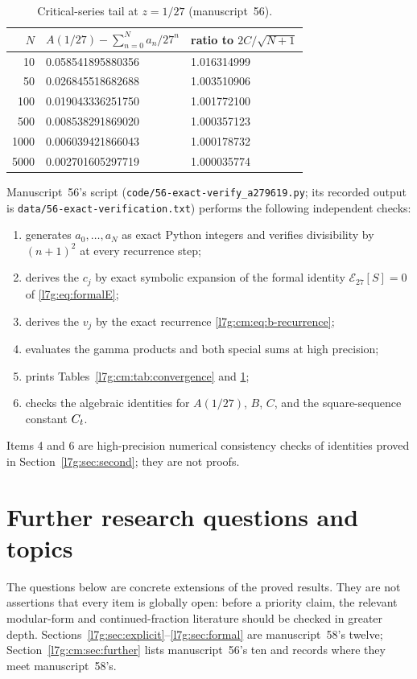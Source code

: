 \documentclass[11pt,letterpaper]{article}
\newcommand{\file}[1]{\nolinkurl{#1}}
\theoremstyle{remark}\newtheorem{remark}[theorem]{Remark}
\newcounter{l7gtrsavedeq}
\begin{document}
\begin{table}[htbp]
\centering\small
\caption{Critical-series tail at $z=1/27$ (manuscript~56).}
\label{l7g:cm:tab:tail}
\begin{tabular}{rll}
\toprule
$N$ & $A(1/27)-\sum_{n=0}^{N}a_n/27^n$
& ratio to $2C/\sqrt{N+1}$\\
\midrule
10   & 0.058541895880356 & 1.016314999\\
50   & 0.026845518682688 & 1.003510906\\
100  & 0.019043336251750 & 1.001772100\\
500  & 0.008538291869020 & 1.000357123\\
1000 & 0.006039421866043 & 1.000178732\\
5000 & 0.002701605297719 & 1.000035774\\
\bottomrule
\end{tabular}
\end{table}

Manuscript~56's script (\file{code/56-exact-verify_a279619.py}; its
recorded output is \file{data/56-exact-verification.txt}) performs the
following independent checks:
\begin{enumerate}[leftmargin=2em]
\item generates $a_0,\ldots,a_N$ as exact Python integers and verifies
      divisibility by $(n+1)^2$ at every recurrence step;
\item derives the $c_j$ by exact symbolic expansion of the formal identity
      $\mathcal E_{27}[S]=0$ of \eqref{l7g:eq:formalE};
\item derives the $v_j$ by the exact recurrence
      \eqref{l7g:cm:eq:b-recurrence};
\item evaluates the gamma products and both special sums at high
      precision;
\item prints Tables~\ref{l7g:cm:tab:convergence} and \ref{l7g:cm:tab:tail};
\item checks the algebraic identities for $A(1/27)$, $B$, $C$, and
      the square-sequence constant $C_{t}$.
\end{enumerate}
Items 4 and 6 are high-precision numerical consistency checks of
identities proved in Section~\ref{l7g:sec:second}; they are not proofs.

\section{Further research questions and topics}\label{l7g:sec:further}

The questions below are concrete extensions of the proved results.
They are not assertions that every item is globally open: before a
priority claim, the relevant modular-form and continued-fraction
literature should be checked in greater depth.
Sections~\ref{l7g:sec:explicit}--\ref{l7g:sec:formal} are manuscript~58's
twelve; Section~\ref{l7g:cm:sec:further} lists manuscript~56's ten and
records where they meet manuscript~58's.
\end{document}
